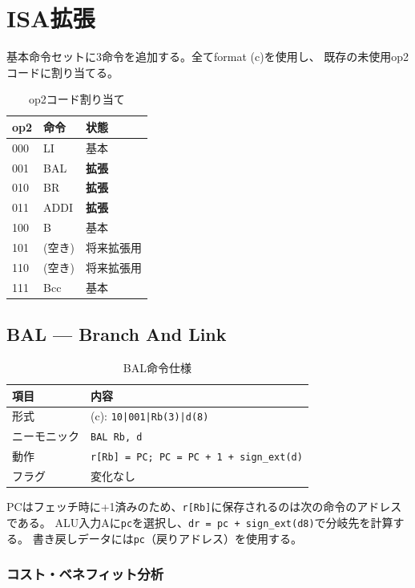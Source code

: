 \documentclass[a4paper,11pt]{ltjsarticle}
\begin{document}
\section{ISA拡張}

基本命令セットに3命令を追加する。全てformat (c)を使用し、
既存の未使用op2コードに割り当てる。

\begin{table}[h]
\centering
\caption{op2コード割り当て}
\begin{tabular}{lll}
\toprule
op2 & 命令 & 状態 \\
\midrule
000 & LI  & 基本 \\
001 & BAL & \textbf{拡張} \\
010 & BR  & \textbf{拡張} \\
011 & ADDI & \textbf{拡張} \\
100 & B   & 基本 \\
101 & (空き) & 将来拡張用 \\
110 & (空き) & 将来拡張用 \\
111 & Bcc & 基本 \\
\bottomrule
\end{tabular}
\end{table}

\subsection{BAL — Branch And Link}

\begin{table}[h]
\centering
\caption{BAL命令仕様}
\begin{tabular}{ll}
\toprule
項目 & 内容 \\
\midrule
形式        & (c): \texttt{10|001|Rb(3)|d(8)} \\
ニーモニック & \texttt{BAL Rb, d} \\
動作        & \texttt{r[Rb] = PC; PC = PC + 1 + sign\_ext(d)} \\
フラグ      & 変化なし \\
\bottomrule
\end{tabular}
\end{table}

PCはフェッチ時に+1済みのため、\texttt{r[Rb]}に保存されるのは次の命令のアドレスである。
ALU入力Aに\texttt{pc}を選択し、\texttt{dr = pc + sign\_ext(d8)}で分岐先を計算する。
書き戻しデータには\texttt{pc}（戻りアドレス）を使用する。

\subsubsection{コスト・ベネフィット分析}
\end{document}
